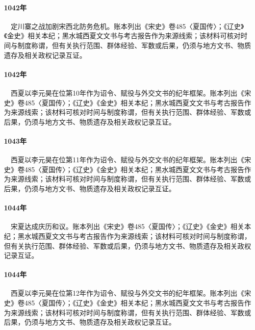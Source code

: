 \paragraph{1042年}　定川寨之战加剧宋西北防务危机。账本列出《宋史》卷485〈夏国传〉；《辽史》《金史》相关本纪；黑水城西夏文文书与考古报告作为来源线索；该材料可核对时间与制度称谓，但有关执行范围、群体经验、军数或后果，仍须与地方文书、物质遗存及相关政权记录互证。

\paragraph{1042年}　西夏以李元昊在位第10年作为诏令、赋役与外交文书的纪年框架。账本列出《宋史》卷485〈夏国传〉；《辽史》《金史》相关本纪；黑水城西夏文文书与考古报告作为来源线索；该材料可核对时间与制度称谓，但有关执行范围、群体经验、军数或后果，仍须与地方文书、物质遗存及相关政权记录互证。

\paragraph{1043年}　西夏以李元昊在位第11年作为诏令、赋役与外交文书的纪年框架。账本列出《宋史》卷485〈夏国传〉；《辽史》《金史》相关本纪；黑水城西夏文文书与考古报告作为来源线索；该材料可核对时间与制度称谓，但有关执行范围、群体经验、军数或后果，仍须与地方文书、物质遗存及相关政权记录互证。

\paragraph{1044年}　宋夏达成庆历和议。账本列出《宋史》卷485〈夏国传〉；《辽史》《金史》相关本纪；黑水城西夏文文书与考古报告作为来源线索；该材料可核对时间与制度称谓，但有关执行范围、群体经验、军数或后果，仍须与地方文书、物质遗存及相关政权记录互证。

\paragraph{1044年}　西夏以李元昊在位第12年作为诏令、赋役与外交文书的纪年框架。账本列出《宋史》卷485〈夏国传〉；《辽史》《金史》相关本纪；黑水城西夏文文书与考古报告作为来源线索；该材料可核对时间与制度称谓，但有关执行范围、群体经验、军数或后果，仍须与地方文书、物质遗存及相关政权记录互证。

